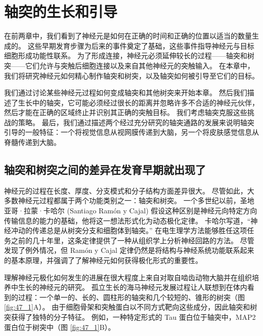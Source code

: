 \chapter{轴突的生长和引导} \label{chap:chap47}
在前两章中，我们看到了神经元是如何在正确的时间和正确的位置以适当的数量生成的。 这些早期发育步骤为后来的事件奠定了基础，这些事件指导神经元与目标细胞形成功能性联系。 为了形成连接，神经元必须延伸较长的过程——轴突和树突——它们允许与突触后细胞连接以及来自其他神经元的突触输入。 在本章中，我们将研究神经元如何精心制作轴突和树突，以及轴突如何被引导至它们的目标。

我们通过讨论某些神经元过程如何变成轴突和其他树突来开始本章。 然后我们描述了生长中的轴突，它可能必须经过很长的距离并忽略许多不合适的神经元伙伴，然后才能在正确的区域终止并识别其正确的突触目标。 我们考虑轴突克服这些挑战的策略。 最后，我们通过描述两个经过充分研究的轴突通路的发展来说明轴突引导的一般特征：一个将视觉信息从视网膜传递到大脑，另一个将皮肤感觉信息从脊髓传递到大脑。

\section{轴突和树突之间的差异在发育早期就出现了}

神经元的过程在长度、厚度、分支模式和分子结构方面差异很大。 尽管如此，大多数神经元过程都属于两个功能类别之一：轴突和树突。 一个多世纪以前，圣地亚哥·拉蒙·卡哈尔 (Santiago Ramón y Cajal) 假设这种区别是神经元向特定方向传输信息的能力的基础，他将这一想法形式化为动态极化定律。 卡哈尔写道，“神经冲动的传递总是从树突分支和细胞体到轴突。” 在电生理学方法能够胜任这项任务之前的几十年里，这条定律提供了一种从组织学上分析神经回路的方法。 尽管发现了例外情况，但 Ramón y Cajal 定律仍然是将结构与神经系统功能联系起来的基本原理，并强调了了解神经元如何获得极化形式的重要性。

理解神经元极化如何发生的进展在很大程度上来自对取自啮齿动物大脑并在组织培养中生长的神经元的研究。 孤立生长的海马神经元发展过程让人联想到在体内看到的过程：一个单一的、长的、圆柱形的轴突和几个较短的、锥形的树突（图 \ref{fig:47_1}A）。 
由于细胞骨架和突触蛋白以不同方式靶向这些成分，因此轴突和树突获得了独特的分子特征。 例如，一种特定形式的 Tau 蛋白位于轴突中，MAP2 蛋白位于树突中（图 \ref{fig:47_1}B）。

